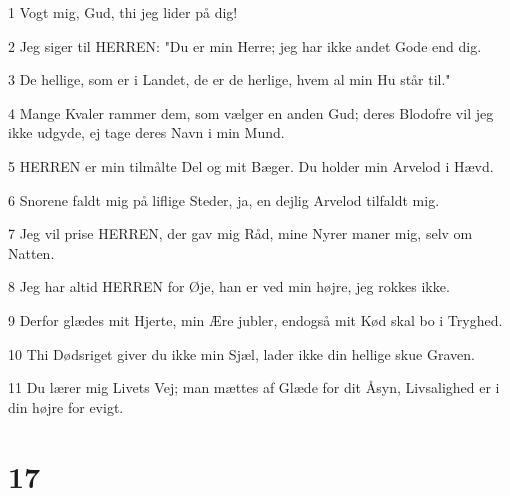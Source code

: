 \par 1 Vogt mig, Gud, thi jeg lider på dig!
\par 2 Jeg siger til HERREN: "Du er min Herre; jeg har ikke andet Gode end dig.
\par 3 De hellige, som er i Landet, de er de herlige, hvem al min Hu står til."
\par 4 Mange Kvaler rammer dem, som vælger en anden Gud; deres Blodofre vil jeg ikke udgyde, ej tage deres Navn i min Mund.
\par 5 HERREN er min tilmålte Del og mit Bæger. Du holder min Arvelod i Hævd.
\par 6 Snorene faldt mig på liflige Steder, ja, en dejlig Arvelod tilfaldt mig.
\par 7 Jeg vil prise HERREN, der gav mig Råd, mine Nyrer maner mig, selv om Natten.
\par 8 Jeg har altid HERREN for Øje, han er ved min højre, jeg rokkes ikke.
\par 9 Derfor glædes mit Hjerte, min Ære jubler, endogså mit Kød skal bo i Tryghed.
\par 10 Thi Dødsriget giver du ikke min Sjæl, lader ikke din hellige skue Graven.
\par 11 Du lærer mig Livets Vej; man mættes af Glæde for dit Åsyn, Livsalighed er i din højre for evigt.

\chapter{17}

